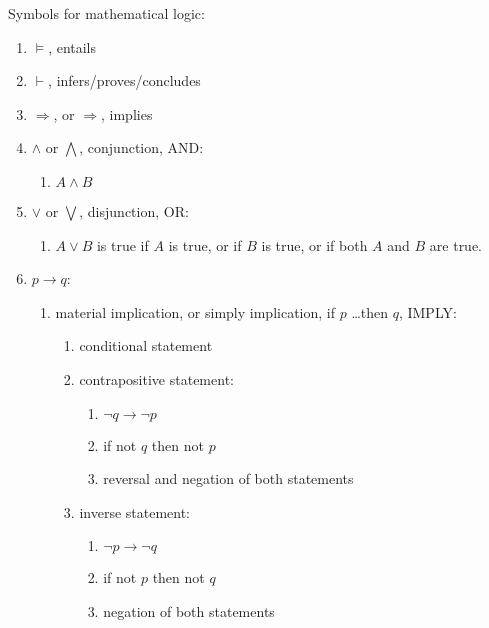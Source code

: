Symbols for mathematical logic: \vspace{-0.3cm}
\begin{enumerate} \itemsep -4pt
\item $\models$, entails
\item $\vdash$, infers/proves/concludes
\item $\Rightarrow$, or $\Longrightarrow$, implies
\item $\land$ or $\bigwedge$, conjunction, AND: \vspace{-0.3cm}
	\begin{enumerate} \itemsep -2pt
	\item $A\land B$
	\end{enumerate}
\item $\lor$ or $\bigvee$, disjunction, OR: \vspace{-0.3cm}
	\begin{enumerate} \itemsep -2pt
	\item $A\lor B$ is true if ${\displaystyle A}$ is true, or if ${\displaystyle B}$ is true, or if both ${\displaystyle A}$ and ${\displaystyle B}$ are true.
	\end{enumerate}
\item $p \rightarrow q$: \vspace{-0.3cm}
	\begin{enumerate} \itemsep -2pt
	\item material implication, or simply implication, if $p$ \dots then $q$, IMPLY: \vspace{-0.2cm}
		\begin{enumerate} \itemsep -2pt
		\item conditional statement
		\item contrapositive statement: \vspace{-0.1cm}
			\begin{enumerate} \itemsep -1pt
			\item $\neg q \longrightarrow \neg p$
			\item if not $q$ then not $p$
			\item reversal and negation of both statements
			\end{enumerate}
		\item inverse statement: \vspace{-0.1cm}
			\begin{enumerate} \itemsep -1pt
			\item $\neg p \longrightarrow \neg q$
			\item if not $p$ then not $q$
			\item negation of both statements

\end{enumerate}
\end{enumerate}
\end{enumerate}
\end{enumerate}
